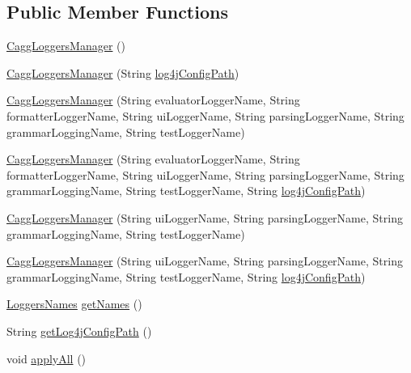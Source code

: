 \subsection*{Public Member Functions}
\begin{DoxyCompactItemize}
\item 
\hyperlink{classit_1_1emarolab_1_1cagg_1_1debugging_1_1CaggLoggersManager_a02e32a677e2c0353dfbe152ce5d010c5}{Cagg\-Loggers\-Manager} ()
\item 
\hyperlink{classit_1_1emarolab_1_1cagg_1_1debugging_1_1CaggLoggersManager_a1446eb3b77a03dac0631963d6caf4fe2}{Cagg\-Loggers\-Manager} (String \hyperlink{classit_1_1emarolab_1_1cagg_1_1debugging_1_1CaggLoggersManager_a833228399db3ceab30d89f46722a4e08}{log4j\-Config\-Path})
\item 
\hyperlink{classit_1_1emarolab_1_1cagg_1_1debugging_1_1CaggLoggersManager_a062b6b71718e93d19140dad2d745c106}{Cagg\-Loggers\-Manager} (String evaluator\-Logger\-Name, String formatter\-Logger\-Name, String ui\-Logger\-Name, String parsing\-Logger\-Name, String grammar\-Logging\-Name, String test\-Logger\-Name)
\item 
\hyperlink{classit_1_1emarolab_1_1cagg_1_1debugging_1_1CaggLoggersManager_ad8aed6f6dca88d3bb83d69fcc7c0a071}{Cagg\-Loggers\-Manager} (String evaluator\-Logger\-Name, String formatter\-Logger\-Name, String ui\-Logger\-Name, String parsing\-Logger\-Name, String grammar\-Logging\-Name, String test\-Logger\-Name, String \hyperlink{classit_1_1emarolab_1_1cagg_1_1debugging_1_1CaggLoggersManager_a833228399db3ceab30d89f46722a4e08}{log4j\-Config\-Path})
\item 
\hyperlink{classit_1_1emarolab_1_1cagg_1_1debugging_1_1CaggLoggersManager_ae3bd98040f80504a2ef8d01869b67055}{Cagg\-Loggers\-Manager} (String ui\-Logger\-Name, String parsing\-Logger\-Name, String grammar\-Logging\-Name, String test\-Logger\-Name)
\item 
\hyperlink{classit_1_1emarolab_1_1cagg_1_1debugging_1_1CaggLoggersManager_a1f7a3b3aa778277dead7a2cc7e35a7f3}{Cagg\-Loggers\-Manager} (String ui\-Logger\-Name, String parsing\-Logger\-Name, String grammar\-Logging\-Name, String test\-Logger\-Name, String \hyperlink{classit_1_1emarolab_1_1cagg_1_1debugging_1_1CaggLoggersManager_a833228399db3ceab30d89f46722a4e08}{log4j\-Config\-Path})
\item 
\hyperlink{classit_1_1emarolab_1_1cagg_1_1debugging_1_1CaggLoggersManager_1_1LoggersNames}{Loggers\-Names} \hyperlink{classit_1_1emarolab_1_1cagg_1_1debugging_1_1CaggLoggersManager_a641f8e103d846b8ed65a2baea1b5f839}{get\-Names} ()
\item 
String \hyperlink{classit_1_1emarolab_1_1cagg_1_1debugging_1_1CaggLoggersManager_a3b6b13e1eb6c86c297733e014760ff90}{get\-Log4j\-Config\-Path} ()
\item 
void \hyperlink{classit_1_1emarolab_1_1cagg_1_1debugging_1_1CaggLoggersManager_a159a4acb62acbf1d49395f8e071c240e}{apply\-All} ()
\end{DoxyCompactItemize}
